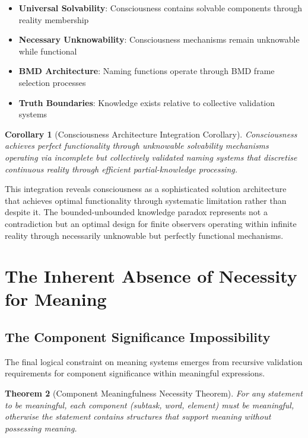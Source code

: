 \documentclass[12pt,a4paper]{article}
\newtheorem{theorem}{Theorem}[section]
\newtheorem{corollary}[theorem]{Corollary}
\begin{document}
\begin{itemize}
\item \textbf{Universal Solvability}: Consciousness contains solvable components through reality membership
\item \textbf{Necessary Unknowability}: Consciousness mechanisms remain unknowable while functional
\item \textbf{BMD Architecture}: Naming functions operate through BMD frame selection processes
\item \textbf{Truth Boundaries}: Knowledge exists relative to collective validation systems
\end{itemize}

\begin{corollary}[Consciousness Architecture Integration Corollary]
Consciousness achieves perfect functionality through unknowable solvability mechanisms operating via incomplete but collectively validated naming systems that discretise continuous reality through efficient partial-knowledge processing.
\end{corollary}

This integration reveals consciousness as a sophisticated solution architecture that achieves optimal functionality through systematic limitation rather than despite it. The bounded-unbounded knowledge paradox represents not a contradiction but an optimal design for finite observers operating within infinite reality through necessarily unknowable but perfectly functional mechanisms.

\section{The Inherent Absence of Necessity for Meaning}

\subsection{The Component Significance Impossibility}

The final logical constraint on meaning systems emerges from recursive validation requirements for component significance within meaningful expressions.

\begin{theorem}[Component Meaningfulness Necessity Theorem]
For any statement to be meaningful, each component (subtask, word, element) must be meaningful, otherwise the statement contains structures that support meaning without possessing meaning.
\end{theorem}
\end{document}
